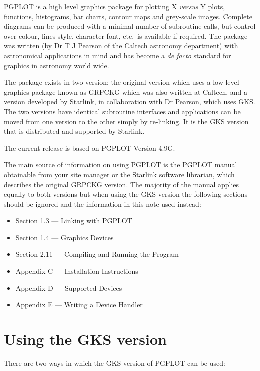 PGPLOT is a high level graphics package for plotting X {\em versus} Y plots,
functions, histograms, bar charts, contour maps and grey-scale images. Complete
diagrams can be produced with a minimal number of subroutine calls, but control
over colour, lines-style, character font, etc.\ is available if required. The
package was written (by Dr T J Pearson of the Caltech astronomy department)
with astronomical applications in mind and has become a {\it de facto} standard
for graphics in astronomy world wide.

The package exists in two version: the original version which uses a low
level graphics package known as GRPCKG which was also written at Caltech,
and a version developed by Starlink, in collaboration with Dr Pearson, which
uses GKS. The two versions have identical subroutine interfaces and
applications can be moved from one version to the other simply by re-linking.
It is the GKS version that is distributed and supported by Starlink.

The current release is based on PGPLOT Version 4.9G.

The main source of information on using PGPLOT is the PGPLOT manual obtainable
from your site manager or the Starlink software librarian, which describes the
original GRPCKG version. The majority of the manual applies equally to both
versions but when using the GKS version the following sections should be
ignored and the information in this note used instead:
\begin{itemize}
\item Section 1.3 --- Linking with PGPLOT
\item Section 1.4 --- Graphics Devices
\item Section 2.11 --- Compiling and Running the Program
\item Appendix C --- Installation Instructions
\item Appendix D --- Supported Devices
\item Appendix E --- Writing a Device Handler
\end{itemize}

\section{Using the GKS version}

There are two ways in which the GKS version of PGPLOT can be used:
     
